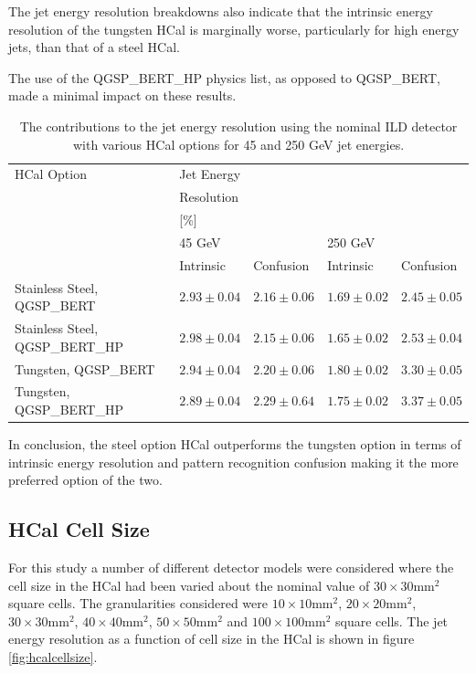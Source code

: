 

The jet energy resolution breakdowns also indicate that the intrinsic energy resolution of the tungsten HCal is marginally worse, particularly for high energy jets, than that of a steel HCal.

The use of the QGSP\_BERT\_HP physics list, as opposed to QGSP\_BERT, made a minimal impact on these results.


\begin{table}[h!]
\centering
\begin{tabular}{ l l l l l }
\hline
HCal Option & Jet Energy & & & \\
 & Resolution & & & \\
 & [\%] & & & \\
 & 45 GeV & & 250 GeV & \\
 & Intrinsic & Confusion & Intrinsic & Confusion \\
\hline
Stainless Steel, QGSP\_BERT & $2.93 \pm 0.04$ & $2.16 \pm 0.06$ & $1.69 \pm 0.02$ &$2.45 \pm 0.05$ \\
Stainless Steel, QGSP\_BERT\_HP & $2.98 \pm 0.04$ &$2.15 \pm 0.06$ &$1.65 \pm 0.02$ &$2.53 \pm 0.04$ \\
Tungsten, QGSP\_BERT & $2.94 \pm 0.04$ &$2.20 \pm 0.06$ &$1.80 \pm 0.02$ &$3.30 \pm 0.05$ \\
Tungsten, QGSP\_BERT\_HP & $2.89 \pm 0.04$ &$2.29 \pm 0.64$ &$1.75 \pm 0.02$ &$3.37 \pm 0.05$ \\
\hline
\end{tabular}
\caption[The contributions to the jet energy resolution using the nominal ILD detector with various HCal options for 45 and 250 GeV jet energies.]{The contributions to the jet energy resolution using the nominal ILD detector with various HCal options for 45 and 250 GeV jet energies.}
\label{table:jerbdhcalabsmaterial}
\end{table}

In conclusion, the steel option HCal outperforms the tungsten option in terms of intrinsic energy resolution and pattern recognition confusion making it the more preferred option of the two.


\subsection{HCal Cell Size}
\label{sec:hcalcells}
For this study a number of different detector models were considered where the cell size in the HCal had been varied about the nominal value of $30 \times 30 \text{mm}^{2}$ square cells.  The granularities considered were $10 \times 10 \text{mm}^{2}$, $20 \times 20 \text{mm}^{2}$, $30 \times 30 \text{mm}^{2}$, $40 \times 40 \text{mm}^{2}$, $50 \times 50 \text{mm}^{2}$ and $100 \times 100 \text{mm}^{2}$ square cells.  The jet energy resolution as a function of cell size in the HCal is shown in figure \ref{fig:hcalcellsize}.

